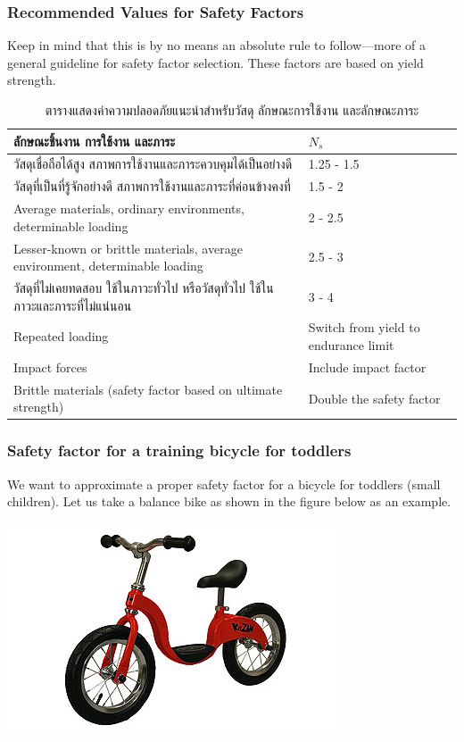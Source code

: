 \documentclass[a4paper,openany,nobib]{tufte-book}
\begin{document}
\subsubsection{Recommended Values for Safety Factors}
\label{recommended-values-for-safety-factors}
Keep in mind that this is by no means an absolute rule to follow---more
of a general guideline for safety factor selection. These factors are
based on yield strength.

\begin{table}[htbp]
\caption{\label{table: safety factor guideline}ตารางแสดงค่าความปลอดภัยแนะนำสำหรับวัสดุ ลักษณะการใช้งาน และลักษณะภาระ}
\centering
\begin{tabular}{p{6cm}p{3cm}}
\toprule
ลักษณะชิ้นงาน การใช้งาน และภาระ & \(N_s\)\\
\midrule
วัสดุเชื่อถือได้สูง สภาพการใช้งานและภาระควบคุมได้เป็นอย่างดี & 1.25 - 1.5\\
วัสดุที่เป็นที่รู้จักอย่างดี สภาพการใช้งานและภาระที่ค่อนข้างคงที่ & 1.5 - 2\\
Average materials, ordinary environments, determinable loading & 2 - 2.5\\
Lesser-known or brittle materials, average environment, determinable loading & 2.5 - 3\\
วัสดุที่ไม่เคยทดสอบ ใช้ในภาวะทั่วไป หรือวัสดุทั่วไป ใช้ในภาวะและภาระที่ไม่แน่นอน & 3 - 4\\
Repeated loading & Switch from yield to endurance limit\\
Impact forces & Include impact factor\\
Brittle materials (safety factor based on ultimate strength) & Double the safety factor\\
\bottomrule
\end{tabular}
\end{table}

\subsubsection{Safety factor for a training bicycle for toddlers}
\label{sec:org65be60d}

We want to approximate a proper safety factor for a bicycle for toddlers
(small children). Let us take a balance bike as shown in the figure
below as an example.

\begin{center}
\includegraphics[width=.9\linewidth]{pictures/intro-eng-design/balance-bike.jpg}
\end{center}
\end{document}
